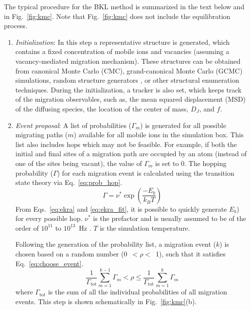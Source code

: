 \documentclass[a4paper,fleqn]{cas-dc}
\begin{document}
{The typical procedure for the BKL method is summarized in the text below and in Fig.~\ref{fig:kmc}. Note that Fig.~{\ref{fig:kmc}} does not include the equilibration process.

\begin{enumerate}
    \item  \emph{Initialization}: In this step a representative structure is generated, which contains a fixed concentration of mobile ions and vacancies (assuming a vacancy-mediated migration mechanism). These structures can be obtained from canonical Monte Carlo (CMC), grand-canonical Monte Carlo (GCMC) \cite{xiao_understanding_2019} simulations, random structure generators \cite{evteev_shrinking_2008}, or  other structural enumeration techniques. During the initialization, a tracker is also set, which keeps track of the migration observables, such as, the mean squared displacement (MSD) of the diffusing species, the location of the center of mass, $D_J$, and $f$. 
    \item \emph{Event proposal}: A list of probabilities ($\Gamma_{m}$) is generated for all possible migrating paths ($m$) available for all mobile ions in the simulation box. This list also includes hops which may not be feasible. For example, if both the initial and final sites of a migration path are occupied by an atom (instead of one of the sites being vacant), the value of $\Gamma_{m}$ is set to 0. The hopping probability ($\Gamma$) for each migration event is calculated using the transition state theory \cite{vineyard_frequency_1957} via Eq.~\ref{eq:prob_hop}. 
    \begin{equation}
    \label{eq:prob_hop}
    \Gamma = \nu^{*}  \exp \left(\frac{- E_{b}}{k_BT}\right)
    \end{equation}
     From Eqs.~\ref{eq:ekra} and \ref{eq:ekra_fit}, it is possible to quickly generate $E_b$) for every possible hop. $\nu ^{*}$ is  the prefactor and is usually assumed to be of the order of $10^{11}$ to $10^{13}$~Hz \cite{van_der_ven_first-principles_2001,kaxiras_adatom_1994}. $T$ is the simulation temperature.   
    
    Following the generation of the probability list, a migration event ($k$) is chosen based on a random number (0~$< \rho <$~1), such that it satisfies Eq.~\ref{eq:choose_event}.
    \begin{equation}
        \label{eq:choose_event}
        \frac{1}{\Gamma_\mathrm{tot}} \sum_{m=1}^{k-1} \Gamma_{m} < \rho \leq \frac{1}{\Gamma_\mathrm{tot}} \sum_{m=1}^{k} \Gamma_{m}
    \end{equation}
    where $\Gamma_\mathrm{tot}$ is the sum of all the individual probabilities of all migration events. This step is shown schematically in Fig.~\ref{fig:kmc}(b).
    

\end{enumerate}}
\end{document}
